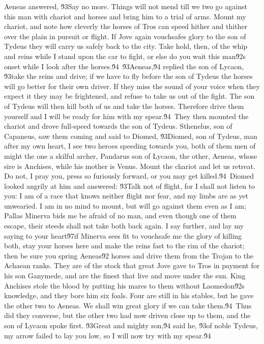 {Aeneas answered, \'93Say no more. Things will not mend till we two go against this man with chariot and horses and bring him to a trial of arms. Mount my chariot, and note how cleverly the horses of Tros can speed hither and thither over the plain in pursuit or flight. If Jove again vouchsafes glory to the son of Tydeus they will carry us safely back to the city. Take hold, then, of the whip and reins while I stand upon the car to fight, or else do you wait this man\'92s onset while I look after the horses.\'94\
\'93Aeneas,\'94 replied the son of Lycaon, \'93take the reins and drive; if we have to fly before the son of Tydeus the horses will go better for their own driver. If they miss the sound of your voice when they expect it they may be frightened, and refuse to take us out of the fight. The son of Tydeus will then kill both of us and take the horses. Therefore drive them yourself and I will be ready for him with my spear.\'94\
They then mounted the chariot and drove full-speed towards the son of Tydeus. Sthenelus, son of Capaneus, saw them coming and said to Diomed, \'93Diomed, son of Tydeus, man after my own heart, I see two heroes speeding towards you, both of them men of might the one a skilful archer, Pandarus son of Lycaon, the other, Aeneas, whose sire is Anchises, while his mother is Venus. Mount the chariot and let us retreat. Do not, I pray you, press so furiously forward, or you may get killed.\'94\
Diomed looked angrily at him and answered: \'93Talk not of flight, for I shall not listen to you: I am of a race that knows neither flight nor fear, and my limbs are as yet unwearied. I am in no mind to mount, but will go against them even as I am; Pallas Minerva bids me be afraid of no man, and even though one of them escape, their steeds shall not take both back again. I say further, and lay my saying to your heart\'97if Minerva sees fit to vouchsafe me the glory of killing both, stay your horses here and make the reins fast to the rim of the chariot; then be sure you spring Aeneas\'92 horses and drive them from the Trojan to the Achaean ranks. They are of the stock that great Jove gave to Tros in payment for his son Ganymede, and are the finest that live and move under the sun. King Anchises stole the blood by putting his mares to them without Laomedon\'92s knowledge, and they bore him six foals. Four are still in his stables, but he gave the other two to Aeneas. We shall win great glory if we can take them.\'94\
Thus did they converse, but the other two had now driven close up to them, and the son of Lycaon spoke first. \'93Great and mighty son,\'94 said he, \'93of noble Tydeus, my arrow failed to lay you low, so I will now try with my spear.\'94\
}
